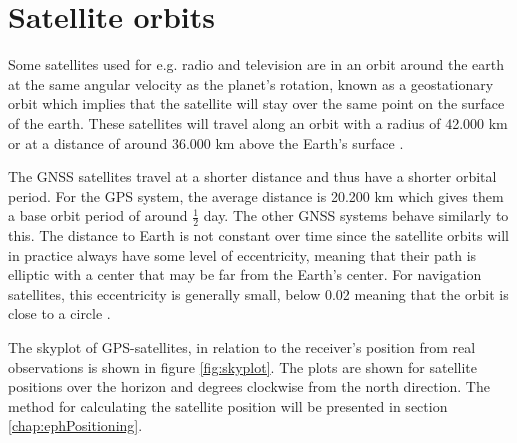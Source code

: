 \section{Satellite orbits}
Some satellites used for e.g. radio and television are in an orbit around the earth at the same angular velocity as the planet's rotation, known as a geostationary orbit which implies that the satellite will stay over the same point on the surface of the earth. These satellites will travel along an orbit with a radius of 42.000 km or at a distance of around 36.000 km above the Earth's surface \cite{soop1994handbook}. 
\par
The GNSS satellites travel at a shorter distance and thus have a shorter orbital period. For the GPS system, the average distance is 20.200 km which gives them a base orbit period of around $\frac{1}{2}$ day. The other GNSS systems behave similarly to this. The distance to Earth is not constant over time since the satellite orbits will in practice always have some level of eccentricity, meaning that their path is elliptic with a center that may be far from the Earth's center. For navigation satellites, this eccentricity is generally small, below 0.02 meaning that the orbit is close to a circle \cite{Jeffrey}.
\par
The skyplot of GPS-satellites, in relation to the receiver's position from real observations is shown in figure \ref{fig:skyplot}. The plots are shown for satellite positions over the horizon and degrees clockwise from the north direction. The method for calculating the satellite position will be presented in section \ref{chap:ephPositioning}.
